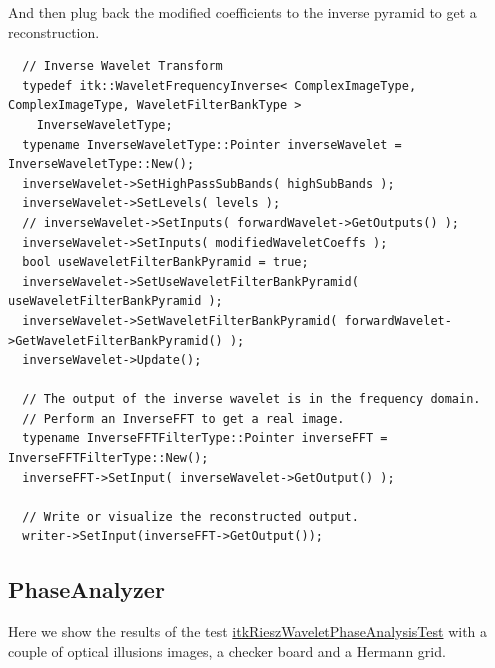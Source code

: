 \documentclass{InsightArticle}
\theoremstyle{definition}
\begin{document}
And then plug back the modified coefficients to the inverse pyramid to get a reconstruction.
\begin{verbatim}
  // Inverse Wavelet Transform
  typedef itk::WaveletFrequencyInverse< ComplexImageType, ComplexImageType, WaveletFilterBankType >
    InverseWaveletType;
  typename InverseWaveletType::Pointer inverseWavelet = InverseWaveletType::New();
  inverseWavelet->SetHighPassSubBands( highSubBands );
  inverseWavelet->SetLevels( levels );
  // inverseWavelet->SetInputs( forwardWavelet->GetOutputs() );
  inverseWavelet->SetInputs( modifiedWaveletCoeffs );
  bool useWaveletFilterBankPyramid = true;
  inverseWavelet->SetUseWaveletFilterBankPyramid( useWaveletFilterBankPyramid );
  inverseWavelet->SetWaveletFilterBankPyramid( forwardWavelet->GetWaveletFilterBankPyramid() );
  inverseWavelet->Update();

  // The output of the inverse wavelet is in the frequency domain.
  // Perform an InverseFFT to get a real image.
  typename InverseFFTFilterType::Pointer inverseFFT = InverseFFTFilterType::New();
  inverseFFT->SetInput( inverseWavelet->GetOutput() );

  // Write or visualize the reconstructed output.
  writer->SetInput(inverseFFT->GetOutput());

\end{verbatim}

\subsection{PhaseAnalyzer}

Here we show the results of the test \href{https://github.com/phcerdan/ITKIsotropicWavelets/blob/5c9f8db0718164675eecd6b134e66d4015394ff8/test/itkRieszWaveletPhaseAnalysisTest.cxx}{itkRieszWaveletPhaseAnalysisTest} with a couple of optical illusions images, a checker board and a Hermann grid.
\end{document}
